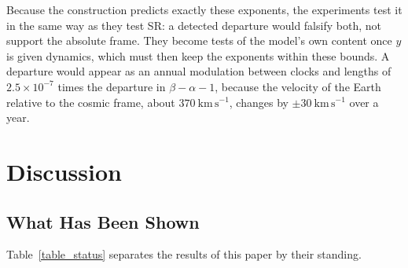 \documentclass{iopjournal}
\begin{document}
Because the construction predicts exactly these exponents, the experiments test it in the same way as they test SR: a detected departure would falsify both, not support the absolute frame. They become tests of the model's own content once $y$ is given dynamics, which must then keep the exponents within these bounds. A departure would appear as an annual modulation between clocks and lengths of $2.5\times10^{-7}$ times the departure in $\beta-\alpha-1$, because the velocity of the Earth relative to the cosmic frame, about $370~\mathrm{km\,s^{-1}}$, changes by $\pm30~\mathrm{km\,s^{-1}}$ over a year.

\section{Discussion}\label{sec_discussion}

\subsection{What Has Been Shown}\label{sec_what_it_is}

Table~\ref{table_status} separates the results of this paper by their standing.
\end{document}
